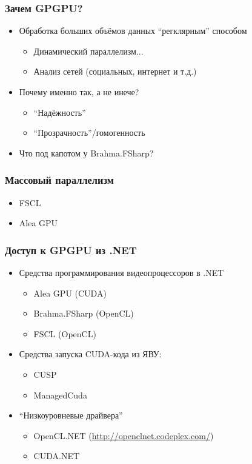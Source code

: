 \documentclass[xcolor=table]{beamer}
\begin{document}
\begin{frame}[fragile]
  \transwipe[direction=90]
  \frametitle{Зачем GPGPU?}
  \begin{itemize}
  \item Обработка больших объёмов данных ``регклярным'' способом
    \begin{itemize}
        \item Динамический параллелизм...
        \item Анализ сетей (социальных, интернет и т.д.)
    \end{itemize}
  \item Почему именно так, а не инече?
      \begin{itemize}
        \item ``Надёжность''
        \item ``Прозрачность''/гомогенность
      \end{itemize}
   \item Что под капотом у Brahma.FSharp?
  \end{itemize}
\end{frame}


\begin{frame}[fragile]
  \transwipe[direction=90]
  \frametitle{Массовый параллелизм}
  \begin{itemize}
  \item FSCL
  \item Alea GPU
  \end{itemize}
\end{frame}

\begin{frame}[fragile]
  \transwipe[direction=90]
  \frametitle{Доступ к GPGPU из .NET}
  \begin{itemize}
  \item Средства программирования видеопроцессоров в .NET
  \begin{itemize}
     \item Alea GPU (CUDA)
     \item Brahma.FSharp (OpenCL)
     \item FSCL (OpenCL)
  \end{itemize}
  \item Средства запуска CUDA-кода из ЯВУ:
  \begin{itemize}
     \item CUSP
     \item ManagedCuda
  \end{itemize}
  \item ``Низкоуровневые драйвера''
  \begin{itemize}
     \item OpenCL.NET (\url{http://openclnet.codeplex.com/})
     \item CUDA.NET
  \end{itemize}
  \end{itemize}
\end{frame}
\end{document}
